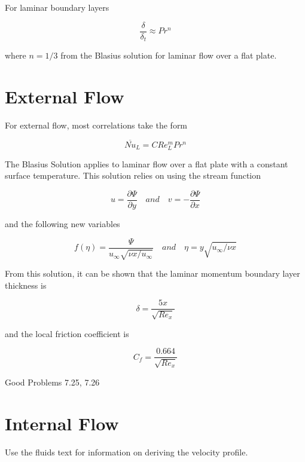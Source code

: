 \documentclass[paper=letter, fontsize=11pt]{scrartcl}
\numberwithin{equation}{section}        %
\numberwithin{figure}{section}          %
\numberwithin{table}{section}               %
\begin{document}
For laminar boundary layers

\begin{equation}
\frac{\delta}{\delta_t} \approx Pr^n
\end{equation}

\noindent where $n=1/3$ from the Blasius solution for laminar flow over a flat plate.


\section{External Flow}

For external flow, most correlations take the form

\begin{equation}
\overline{Nu}_L = CRe_L^mPr^n
\end{equation}

The Blasius Solution applies to laminar flow over a flat plate with a constant surface temperature. This solution relies on using the stream function 

\begin{equation}
u = \frac{\partial\Psi}{\partial y}\quad and\quad v = -\frac{\partial\Psi}{\partial x}
\end{equation}

\noindent and the following new variables

\begin{equation}
f(\eta) = \frac{\Psi}{u_\infty\sqrt{\nu x/u_\infty}}\quad and\quad \eta = y\sqrt{u_\infty/\nu x}
\end{equation}

From this solution, it can be shown that the laminar momentum boundary layer thickness is

\begin{equation}
\delta = \frac{5x}{\sqrt{Re_x}}
\end{equation}

\noindent and the local friction coefficient is 

\begin{equation}
C_f = \frac{0.664}{\sqrt{Re_x}}
\end{equation}

\bigskip Good Problems 7.25, 7.26


\section{Internal Flow}

Use the fluids text for information on deriving the velocity profile.
\end{document}
